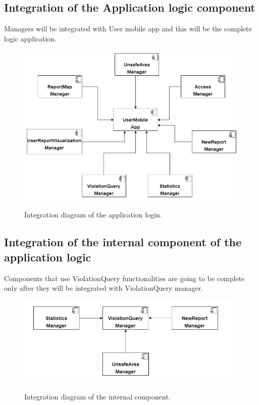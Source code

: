 \documentclass[../RASD.tex]{subfiles}
\begin{document}
    \subsection{Integration of the Application logic component}\label{sec:integration-of-the-application-logic-component}
    Managers will be integrated with User mobile app and this will be the complete logic application.
    \begin{figure}[H]
        \centering
        \includegraphics[scale = 0.8]{assets/integration_diagrams/user_mobile_app_integration.png}\\[1.6 cm]
        \caption[\textit{Integration} Diagram of the application logic]{Integration diagram of the application login.}
    \end{figure}
    \subsection{Integration of the internal component of the application logic}\label{sec:integration-of-the-internal-component-of-the-application-logic}
    Components that use ViolationQuery functionalities are going to be complete only after they will be integrated with ViolationQuery manager.
    \begin{figure}[H]
        \centering
        \includegraphics[scale = 0.8]{assets/integration_diagrams/violation_query_integration.png}\\[1.6 cm]
        \caption[\textit{Integration} Diagram of the internal component]{Integration diagram of the internal component.}
    \end{figure}
\end{document}
